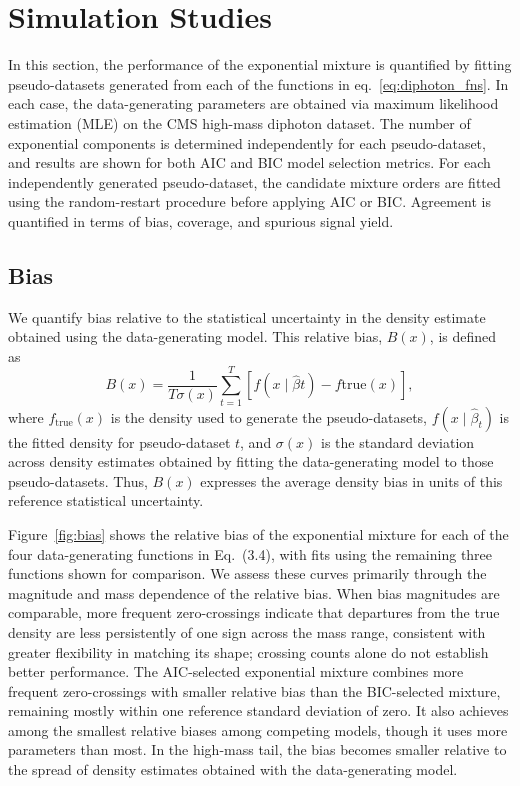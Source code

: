 \documentclass[a4paper,11pt]{article}
\begin{document}
\section{Simulation Studies}\label{sec:toys}

In this section, the performance of the exponential mixture is quantified by fitting pseudo-datasets generated from each of the functions in eq.~\eqref{eq:diphoton_fns}. In each case, the data-generating parameters are obtained via maximum likelihood estimation (MLE) on the CMS high-mass diphoton dataset. The number of exponential components is determined independently for each pseudo-dataset, and results are shown for both AIC and BIC model selection metrics. For each independently generated pseudo-dataset, the candidate mixture orders are fitted using the random-restart procedure before applying AIC or BIC. Agreement is quantified in terms of bias, coverage, and spurious signal yield.

\subsection*{Bias}

We quantify bias relative to the statistical uncertainty in the density estimate obtained using the data-generating model. This relative bias, $B(x)$, is defined as
\begin{equation}
B(x)=\frac{1}{T\sigma(x)}
\sum_{t=1}^{T}\left[f(x\mid\hat{\beta}t)-f{\mathrm{true}}(x)\right],
\end{equation}
where $f_{\mathrm{true}}(x)$ is the density used to generate the pseudo-datasets, $f(x\mid\hat{\beta}_t)$ is the fitted density for pseudo-dataset $t$, and $\sigma(x)$ is the standard deviation across density estimates obtained by fitting the data-generating model to those pseudo-datasets. Thus, $B(x)$ expresses the average density bias in units of this reference statistical uncertainty.

Figure~\ref{fig:bias} shows the relative bias of the exponential mixture for each of the four data-generating functions in Eq.~(3.4), with fits using the remaining three functions shown for comparison. We assess these curves primarily through the magnitude and mass dependence of the relative bias. When bias magnitudes are comparable, more frequent zero-crossings indicate that departures from the true density are less persistently of one sign across the mass range, consistent with greater flexibility in matching its shape; crossing counts alone do not establish better performance. The AIC-selected exponential mixture combines more frequent zero-crossings with smaller relative bias than the BIC-selected mixture, remaining mostly within one reference standard deviation of zero. It also achieves among the smallest relative biases among competing models, though it uses more parameters than most. In the high-mass tail, the bias becomes smaller relative to the spread of density estimates obtained with the data-generating model.
\end{document}
